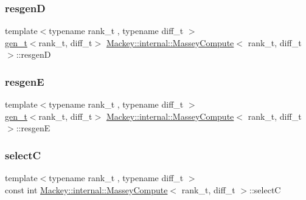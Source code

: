 \mbox{\label{structMackey_1_1internal_1_1MasseyCompute_ae86523a910e92c2aea2fee7243ba9bb2}} 
\subsubsection{\texorpdfstring{resgenD}{resgenD}}
{\footnotesize\ttfamily template$<$typename rank\+\_\+t , typename diff\+\_\+t $>$ \\
\hyperlink{namespaceMackey_a6bb0b2796632ba6c7f8ea192f7aecffe}{gen\+\_\+t}$<$rank\+\_\+t, diff\+\_\+t$>$ \hyperlink{structMackey_1_1internal_1_1MasseyCompute}{Mackey\+::internal\+::\+Massey\+Compute}$<$ rank\+\_\+t, diff\+\_\+t $>$\+::resgenD}

\mbox{\label{structMackey_1_1internal_1_1MasseyCompute_a325c0dfc10b07a8c85a52a0b99087bd1}} 
\subsubsection{\texorpdfstring{resgenE}{resgenE}}
{\footnotesize\ttfamily template$<$typename rank\+\_\+t , typename diff\+\_\+t $>$ \\
\hyperlink{namespaceMackey_a6bb0b2796632ba6c7f8ea192f7aecffe}{gen\+\_\+t}$<$rank\+\_\+t, diff\+\_\+t$>$ \hyperlink{structMackey_1_1internal_1_1MasseyCompute}{Mackey\+::internal\+::\+Massey\+Compute}$<$ rank\+\_\+t, diff\+\_\+t $>$\+::resgenE}

\mbox{\label{structMackey_1_1internal_1_1MasseyCompute_afdb77fc849be0448d788efb20b1a8bc7}} 
\subsubsection{\texorpdfstring{selectC}{selectC}}
{\footnotesize\ttfamily template$<$typename rank\+\_\+t , typename diff\+\_\+t $>$ \\
const int \hyperlink{structMackey_1_1internal_1_1MasseyCompute}{Mackey\+::internal\+::\+Massey\+Compute}$<$ rank\+\_\+t, diff\+\_\+t $>$\+::selectC}


